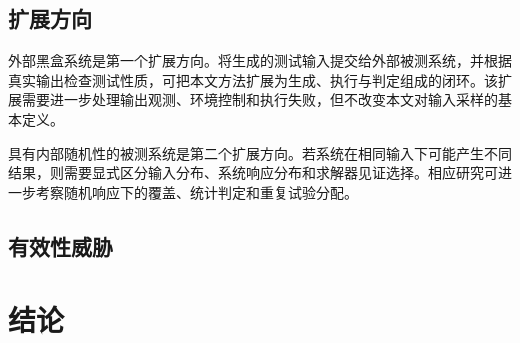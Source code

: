 \documentclass[UTF8, fontset=none, a4paper, 12pt]{ctexart}
\begin{document}
\subsection{扩展方向}

外部黑盒系统是第一个扩展方向。将生成的测试输入提交给外部被测系统，并根据真实输出检查测试性质，可把本文方法扩展为生成、执行与判定组成的闭环。该扩展需要进一步处理输出观测、环境控制和执行失败，但不改变本文对输入采样的基本定义。

具有内部随机性的被测系统是第二个扩展方向。若系统在相同输入下可能产生不同结果，则需要显式区分输入分布、系统响应分布和求解器见证选择。相应研究可进一步考察随机响应下的覆盖、统计判定和重复试验分配。

\subsection{有效性威胁}


\section{结论}

\end{document}
